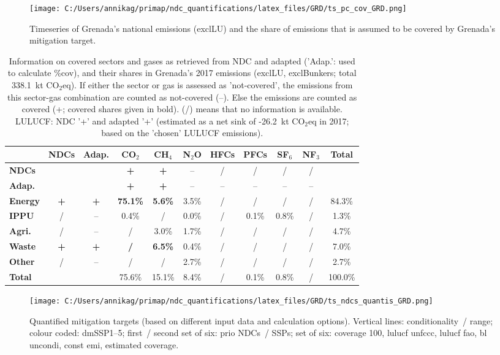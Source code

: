 \documentclass[12pt]{article}
\begin{document}
 \begin{figure}[H]
 \centering
 \texttt{[image: C:/Users/annikag/primap/ndc\_quantifications/latex\_files/GRD/ts\_pc\_cov\_GRD.png]}
 \caption{Timeseries of Grenada's national emissions (exclLU) and the share of emissions that is assumed to be covered by Grenada's mitigation target.}
 \label{fig:tsPcCov}
 \end{figure}

 \begin{table}[H]\small
 \centering
 \caption{Information on covered sectors and gases as retrieved from NDC and adapted ('Adap.': used to calculate \%cov), and their shares in Grenada's 2017 emissions (exclLU, exclBunkers; total 338.1~kt CO$_2$eq).
 If either the sector or gas is assessed as 'not-covered', the emissions from this sector-gas combination are counted as not-covered (--). 
 Else the emissions are counted as covered (+; covered shares given in bold).
 (/) means that no information is available.
 LULUCF: NDC '+' and adapted '+' (estimated as a net sink of -26.2~kt CO$_2$eq in 2017; based on the 'chosen' LULUCF emissions).}
 \label{tab:coveredSectorsGases}
 \begin{tabular}{l || c c || c c c c c c c | c}
 \bfseries  & \bfseries NDCs & \bfseries Adap. & \bfseries CO$_2$ & \bfseries CH$_4$ & \bfseries N$_2$O & \bfseries HFCs & \bfseries PFCs & \bfseries SF$_6$ & \bfseries NF$_3$ & \bfseries Total \tabularnewline \hline \hline
 \bfseries NDCs &  &  & \bfseries + & \bfseries + & -- & / & / & / & / &  \tabularnewline 
 \bfseries Adap. &  &  & \bfseries + & \bfseries + & -- & -- & -- & -- & -- &  \tabularnewline \hline \hline
 \bfseries Energy & \bfseries + & \bfseries + & \bfseries 75.1\% & \bfseries 5.6\% & 3.5\% & / & / & / & / & 84.3\% \tabularnewline 
 \bfseries IPPU & / & -- & 0.4\% & / & 0.0\% & / & 0.1\% & 0.8\% & / & 1.3\% \tabularnewline 
 \bfseries Agri. & / & -- & / & 3.0\% & 1.7\% & / & / & / & / & 4.7\% \tabularnewline 
 \bfseries Waste & \bfseries + & \bfseries + & \bfseries / & \bfseries 6.5\% & 0.4\% & / & / & / & / & 7.0\% \tabularnewline 
 \bfseries Other & / & -- & / & / & 2.7\% & / & / & / & / & 2.7\% \tabularnewline \hline
 \bfseries Total &  &  & 75.6\% & 15.1\% & 8.4\% & / & 0.1\% & 0.8\% & / & 100.0\% \tabularnewline 
 \end{tabular}
 \end{table}

 \begin{figure}[H]
 \centering
 \texttt{[image: C:/Users/annikag/primap/ndc\_quantifications/latex\_files/GRD/ts\_ndcs\_quantis\_GRD.png]}
 \caption{Quantified mitigation targets (based on different input data and calculation options).
 Vertical lines: conditionality~/ range;
 colour coded: dmSSP1--5;
 first~/ second set of six: prio NDCs~/ SSPs;
 set of six: coverage 100, lulucf unfccc, lulucf fao, bl uncondi, const emi, estimated coverage.}
 \label{fig:miti}
 \end{figure}
\end{document}
